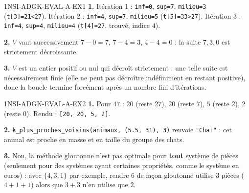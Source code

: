 \begin{corrige}{1NSI-ADGK-EVAL-A-EX1}
\textbf{1.} Itération 1 : \lstinline{inf=0}, \lstinline{sup=7}, \lstinline{milieu=3}
(\lstinline{t[3]=21<27}). Itération 2 : \lstinline{inf=4}, \lstinline{sup=7},
\lstinline{milieu=5} (\lstinline{t[5]=33>27}). Itération 3 : \lstinline{inf=4},
\lstinline{sup=4}, \lstinline{milieu=4} (\lstinline{t[4]=27}, trouvé, indice $4$).

\textbf{2.} $V$ vaut successivement $7-0=7$, $7-4=3$, $4-4=0$ : la suite $7,3,0$ est
strictement décroissante.

\textbf{3.} $V$ est un entier positif ou nul qui décroît strictement : une telle suite est
nécessairement finie (elle ne peut pas décroître indéfiniment en restant positive), donc
la boucle termine forcément après un nombre fini d'itérations.
\end{corrige}

\begin{corrige}{1NSI-ADGK-EVAL-A-EX2}
\textbf{1.} Pour $47$ : $20$ (reste $27$), $20$ (reste $7$), $5$ (reste $2$), $2$ (reste
$0$). Rendu : \lstinline{[20, 20, 5, 2]}.

\textbf{2.} \lstinline{k_plus_proches_voisins(animaux, (5.5, 31), 3)} renvoie
\lstinline{"Chat"} : cet animal est proche en masse et en taille du groupe des chats.

\textbf{3.} Non, la méthode gloutonne n'est pas optimale pour \textbf{tout} système de
pièces (seulement pour des systèmes ayant certaines propriétés, comme le système en euros) :
avec $\{4,3,1\}$ par exemple, rendre $6$ de façon gloutonne utilise $3$ pièces
($4+1+1$) alors que $3+3$ n'en utilise que $2$.
\end{corrige}
